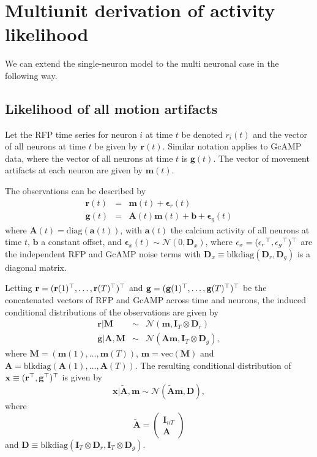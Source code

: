 \documentclass[11pt]{article}
\newcommand{\vecm}{\mathbf{m}}
\newcommand{\vecr}{\mathbf{r}}
\newcommand{\vecg}{\mathbf{g}}
\newcommand{\veca}{\mathbf{a}}
\newcommand{\matA}{\mathbf{A}}
\newcommand{\matD}{\mathbf{D}}
\newcommand{\veps}{\mathbf{\epsilon}}
\newcommand{\vecb}{\mathbf{b}}
\newcommand{\vecx}{\mathbf{x}}
\newcommand{\matM}{\mathbf{M}}
\newcommand{\tA}{\tilde{\mathbf{A}}}
\newcommand{\eye}{\mathbf{I}}
\begin{document}
\section{Multiunit derivation of activity likelihood}
We can extend the single-neuron model to the multi neuronal case in the following way.  

\subsection{Likelihood of all motion artifacts}
Let the RFP time series for neuron $i$ at time $t$ be denoted $r_i(t)$ and the vector of all neurons at time $t$ be given by $\vecr(t)$. Similar notation applies to GcAMP data, where the vector of all neurons at time $t$ is $\vecg(t)$.  The vector of movement artifacts at each neuron are given by $\vecm(t)$.

The observations can be described by
\begin{eqnarray}
\vecr(t)&=&\vecm(t) + \veps_r(t)\\
\vecg(t)&=&\matA(t)\vecm(t) + \vecb + \veps_g(t)
\end{eqnarray}
where $\matA(t) = \text{diag}(\veca(t))$, with $\veca(t)$ the calcium activity of all neurons at time $t$, $\vecb$ a constant offset, and $\veps_x(t)\sim\mathcal{N}(0,\matD_x)$, where $\epsilon_x = (\epsilon_r{^\top},\epsilon_g{^\top}){^\top}$ are the independent RFP and GcAMP noise terms with $\matD_x\equiv\text{blkdiag}(\matD_r,\matD_g)$ is a diagonal matrix. 

Letting $\vecr = (\vecr(1)\trp,\dots,\vecr(T)\trp)\trp$ and $\vecg = (\vecg(1)\trp,\dots,\vecg(T)\trp)\trp$ be the concatenated vectors of RFP and GcAMP across time and neurons, the induced conditional distributions of the observations are given by
\begin{eqnarray}
\label{rliklihood}\vecr|\matM&\sim&\mathcal{N}(\vecm,\eye_T\otimes\matD_r)\\
\vecg |\matA,\matM&\sim&\mathcal{N}(\matA\vecm,\eye_T\otimes\matD_g)\label{gliklihood},
\end{eqnarray}
where $\matM = (\vecm(1),\dots,\vecm(T))$, $\vecm = \text{vec}(\matM)$ and $\matA = \text{blkdiag}(\matA(1),\dots,\matA(T))$.  
The resulting conditional distribution of $\vecx \equiv (\vecr\trp,\vecg\trp)\trp$ is given by
\begin{equation}\label{condx}
\vecx|\tA,\vecm \sim\mathcal{N}(\tA\vecm,\matD),
\end{equation}
where
\[
\tA = \left(
\begin{array}{c}
\eye_{nT}\\
\matA
\end{array}
\right)
\]
and
$\matD \equiv \text{blkdiag}(\eye_T\otimes\matD_r,\eye_T\otimes\matD_g)$. 
\end{document}
